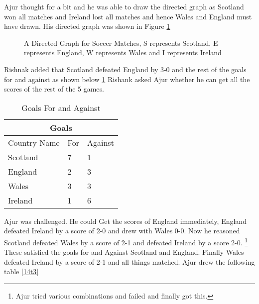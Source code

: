 Ajur thought for a bit and he was able to draw the directed graph as Scotland won all matches and Ireland lost all matches and hence Wales and England must have drawn. His directed graph was shown in Figure \ref{15g33}

\begin{figure}
\begin{center}
\caption{ A Directed Graph for Soccer Matches, S represents Scotland, E represents England, W represents Wales and I represents Ireland}\label{15g33}
\end{center}
\end{figure}

Rishnak added that Scotland defeated England by 3-0 and the rest of the goals for and against as
shown below \ref{14t2} Rishank asked Ajur whether he can get all the scores of the rest of the 5 games.
\begin{table}
\begin{center}
\begin{tabular}{ |p{3cm}||p{1.5cm}||p{1.5cm} || }
 \hline
 \multicolumn{3}{|c|}{Goals} \\
 \hline
 Country Name & For&Against\\
 \hline
 Scotland  & 7    &1\\
 England& 2&3\\
 Wales&3&3\\
 Ireland&1&6\\
 
 \hline
\end{tabular}
\caption{Goals For and Against}\label{14t2}
\end{center}
\end{table}

Ajur was challenged. He could Get the scores of England immediately, England defeated Ireland by a score of 2-0 and drew with Wales 0-0. Now he reasoned Scotland defeated Wales by a score of 2-1 and defeated Ireland by a score 2-0. \footnote{Ajur tried various combinations and failed and finally got this.} These
satisfied the goals for and Against Scotland and England. Finally Wales defeated Ireland by a score of 2-1
and all things matched.
Ajur drew the following table \ref{14t3}

